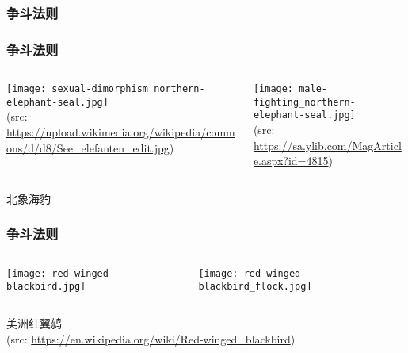 \documentclass[UTF8,lualatex]{ctexbeamer}
\begin{document}
\subsubsection{争斗法则}

\begin{frame}
    \frametitle{争斗法则}
    \begin{columns}[t]
        \begin{column}{.48\textwidth}
            \texttt{[image: sexual-dimorphism\_northern-elephant-seal.jpg]}
            \\
            \tiny
            (src: \url{https://upload.wikimedia.org/wikipedia/commons/d/d8/See_elefanten_edit.jpg})
        \end{column}
        \begin{column}{.48\textwidth}
            \texttt{[image: male-fighting\_northern-elephant-seal.jpg]}
            \\
            \tiny
            (src: \url{https://sa.ylib.com/MagArticle.aspx?id=4815})
        \end{column}
    \end{columns}

    \begin{center}
        \small 北象海豹
    \end{center}
\end{frame}


\begin{frame}
    \frametitle{争斗法则}
    \begin{columns}[t]
        \begin{column}{.48\textwidth}
            \texttt{[image: red-winged-blackbird.jpg]}
        \end{column}
        \begin{column}{.48\textwidth}
            \texttt{[image: red-winged-blackbird\_flock.jpg]}
        \end{column}
    \end{columns}

    \begin{center}
        \small 美洲红翼鸫
        \\
        \tiny
        (src: \url{https://en.wikipedia.org/wiki/Red-winged_blackbird})
    \end{center}
\end{frame}
\end{document}
